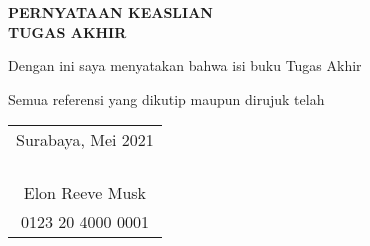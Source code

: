 \begin{center}
  \large
  \textbf{PERNYATAAN KEASLIAN\\TUGAS AKHIR}
\end{center}

\thispagestyle{empty}

\vspace{2ex}


Dengan ini saya menyatakan bahwa isi buku Tugas Akhir \lipsum[1][1-6]

Semua referensi yang dikutip maupun dirujuk telah \lipsum[2][1-4]

\vspace{4ex}

\begin{flushright}
  \begin{tabular}[b]{c}
    Surabaya, Mei 2021\\
    \\
    \\
    \\
    \\
    Elon Reeve Musk\\
    0123 20 4000 0001
  \end{tabular}
\end{flushright}
